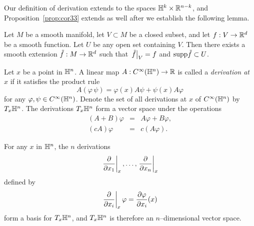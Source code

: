 Our definition of derivation extends to the spaces $\mathbb{H}^k\times\mathbb{R}^{n-k}$, and Proposition~\ref{prop:cor33} extends as well after we establish the following lemma.

\begin{lem}
	\label{lem:ext}
	Let $M$ be a smooth manifold, let $V\subset M$ be a closed subset, and let $f:V\to\mathbb{R}^d$ be a smooth function.
	Let $U$ be any open set containing $V$.
	Then there exists a smooth extension $\tilde{f}:M\to\mathbb{R}^d$ such that $\left.\tilde{f}\right|_{V}=f$ and $\textrm{supp} \tilde{f}\subset U$.
\end{lem}

\begin{defn}[Derivations on $\HH^n$]
	Let $x$ be a point in $\HH^n$.
	A linear map $A:C^\infty(\mathbb{H}^n)\to\mathbb{R}$ is called a \emph{derivation at $x$} if it satisfies the product rule
	\[
	A(\varphi\,\psi)=\varphi(x)A\psi+\psi(x)A\varphi
	\]
	for any $\varphi,\psi\in C^\infty(\mathbb{H}^n)$.
	Denote the set of all derivations at $x$ of $C^\infty(\mathbb{H}^n)$ by $T_x \mathbb{H}^n$.
	The derivations $T_x \mathbb{H}^n$ form a vector space under the operations
	\[
	\begin{array}{rcl}
	(A+B)\varphi&=&A\varphi+B\varphi,\\
	(cA)\varphi&=&c(A\varphi).
	\end{array}
	\]
\end{defn}

\begin{prop}
	\label{prop:cor310}
	For any $x$ in $\HH^n$, the $n$ derivations
	\[
	\left.\frac{\partial}{\partial x_1}\right|_{x}, \dots, \left.\frac{\partial}{\partial x_n}\right|_{x}
	\]
	defined by
	\[
	\left.\frac{\partial}{\partial x_i}\right|_{x}\varphi=\frac{\partial \varphi}{\partial x_i}(x)
	\]
	form a basis for $T_x\mathbb{H}^n$, and $T_x\mathbb{H}^n$ is therefore an $n$--dimensional vector space. 
\end{prop}

